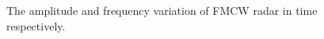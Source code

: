 \begin{figure}
    \centering
    \hspace{-0.4cm}
    \begin{subfigure}{0.45\textwidth}
        \centering
    \end{subfigure}
    \begin{subfigure}{0.45\textwidth}
        \centering
    \end{subfigure}
    \caption{The amplitude and frequency variation of FMCW radar in time respectively.}
	\label{FMCW_signal}
\end{figure}

